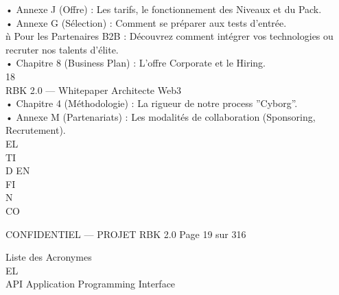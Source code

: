 \documentclass[12pt,landscape,a4paper]{article}
\newenvironment{confidential}
{\begin{tcolorbox}[
    colback=rbkred!5!white,
    colframe=rbkred!75!black,
    title=CONFIDENTIEL,
    fonttitle=\bfseries\color{white},
    coltitle=rbkred!75!black,
    breakable,
    enhanced,
    frame hidden,
    borderline west={2pt}{0pt}{rbkred!75!black}
]}
{\end{tcolorbox}}
\begin{document}
• Annexe J (Offre) : Les tarifs, le fonctionnement des Niveaux et du Pack.\\
• Annexe G (Sélection) : Comment se préparer aux tests d’entrée.\\
\vspace{0.5em}
ǹ Pour les Partenaires B2B : Découvrez comment intégrer vos technologies ou recruter nos talents d’élite.\\
\vspace{0.5em}
• Chapitre 8 (Business Plan) : L’offre Corporate et le Hiring.\\
\vspace{0.5em}
\vspace{0.5em}
\vspace{0.5em}
18\\
RBK 2.0 — Whitepaper Architecte Web3\\
\vspace{0.5em}
\vspace{0.5em}
• Chapitre 4 (Méthodologie) : La rigueur de notre process ”Cyborg”.\\
• Annexe M (Partenariats) : Les modalités de collaboration (Sponsoring, Recrutement).\\
\vspace{0.5em}
\vspace{0.5em}
\vspace{0.5em}
\vspace{0.5em}
EL\\
TI\\
D   EN\\
FI\\
N\\
CO\\
\vspace{0.5em}
\vspace{0.5em}
\vspace{0.5em}
\vspace{0.5em}
\begin{confidential}CONFIDENTIEL — PROJET RBK 2.0                             Page 19 sur 316\end{confidential}
Liste des Acronymes\\
\vspace{0.5em}
\vspace{0.5em}
\vspace{0.5em}
\vspace{0.5em}
EL\\
API Application Programming Interface\\
\vspace{0.5em}
\vspace{0.5em}
\end{document}
